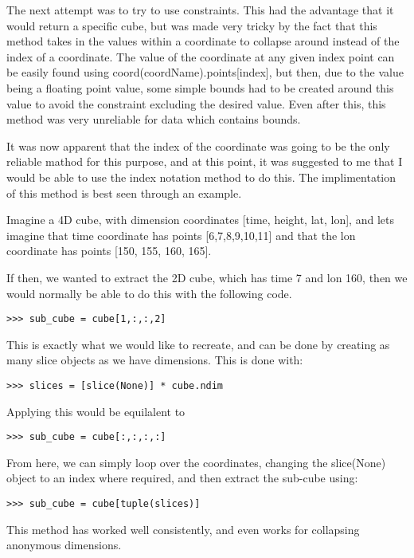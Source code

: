 \documentclass[whitecover]{MO_report}
\begin{document}
The next attempt was to try to use constraints. This had the advantage that it
would return a specific cube, but was made very tricky by the fact that this
method takes in the values within a coordinate to collapse around instead of
the index of a coordinate. The value of the coordinate at any given index point
can be easily found using coord(coordName).points[index], but then, due to
the value being a floating point value, some simple bounds had to be created
around this value to avoid the constraint excluding the desired value. Even
after this, this method was very unreliable for data which contains bounds.

It was now apparent that the index of the coordinate was going to be the only
reliable mathod for this purpose, and at this point, it was suggested to me
that I would be able to use the index notation method to do this. The
implimentation of this method is best seen through an example.

Imagine a 4D cube, with dimension coordinates [time, height, lat, lon], and
lets imagine that time coordinate has points [6,7,8,9,10,11] and that the
lon coordinate has points [150, 155, 160, 165].

If then, we wanted to extract the 2D cube, which has time 7 and lon 160, then
we would normally be able to do this with the following code.

\begin{verbatim}
>>> sub_cube = cube[1,:,:,2]
\end{verbatim}

This is exactly what we would like to recreate, and can be done by creating as
many slice objects as we have dimensions. This is done with:

\begin{verbatim}
>>> slices = [slice(None)] * cube.ndim
\end{verbatim}

Applying this would be equilalent to

\begin{verbatim}
>>> sub_cube = cube[:,:,:,:]
\end{verbatim}

From here, we can simply loop over the coordinates, changing the slice(None)
object to an index where required, and then extract the sub-cube using:

\begin{verbatim}
>>> sub_cube = cube[tuple(slices)]
\end{verbatim}

This method has worked well consistently, and even works for collapsing
anonymous dimensions.
\end{document}
